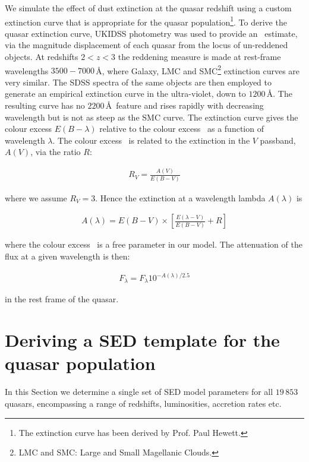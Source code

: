 We simulate the effect of dust extinction at the quasar redshift using a custom extinction curve that is appropriate for the quasar population\footnote{The extinction curve has been derived by Prof. Paul Hewett.}.
To derive the quasar extinction curve, UKIDSS photometry was used to provide an \ebv\, estimate, via the magnitude displacement of each quasar from the locus of un-reddened objects. 
At redshifts $2 < z < 3$ the reddening measure is made at rest-frame wavelengths $3500-7000$\,\AA, where Galaxy, LMC and SMC\footnote{LMC and SMC: Large and Small Magellanic Clouds.} extinction curves are very similar. 
The SDSS spectra of the same objects are then employed to generate an empirical extinction curve in the ultra-violet, down to $1200$\,\AA. 
The resulting curve has no $2200$\,\AA\, feature and rises rapidly with decreasing wavelength but is not as steep as the SMC curve. 
The extinction curve gives the colour excess $E(B-\lambda)$ relative to the colour excess \ebv\, as a function of wavelength $\lambda$. 
The colour excess \ebv\, is related to the extinction in the $V$ passband, $A(V)$, via the ratio $R$: 

\begin{eqnarray}
  R_V = \frac{A(V)}{E(B-V)}
\end{eqnarray}

where we assume $R_V = 3$. 
Hence the extinction at a wavelength lambda $A(\lambda)$ is 

\begin{eqnarray}
  A(\lambda) = E(B-V) \times \left[ \frac{E(\lambda-V)}{E(B-V)} + R \right] 
\end{eqnarray}

where the colour excess \ebv\, is a free parameter in our model. 
The attenuation of the flux at a given wavelength is then:

\begin{eqnarray}
  F_\lambda = F_\lambda10^{-A(\lambda)/2.5}
\end{eqnarray}

in the rest frame of the quasar. 

\section{Deriving a SED template for the quasar population} 
\label{sec:ch5-standardmodel}

In this Section we determine a single set of SED model parameters for all $19\,853$ quasars, encompassing a range of redshifts, luminosities, accretion rates etc. 

